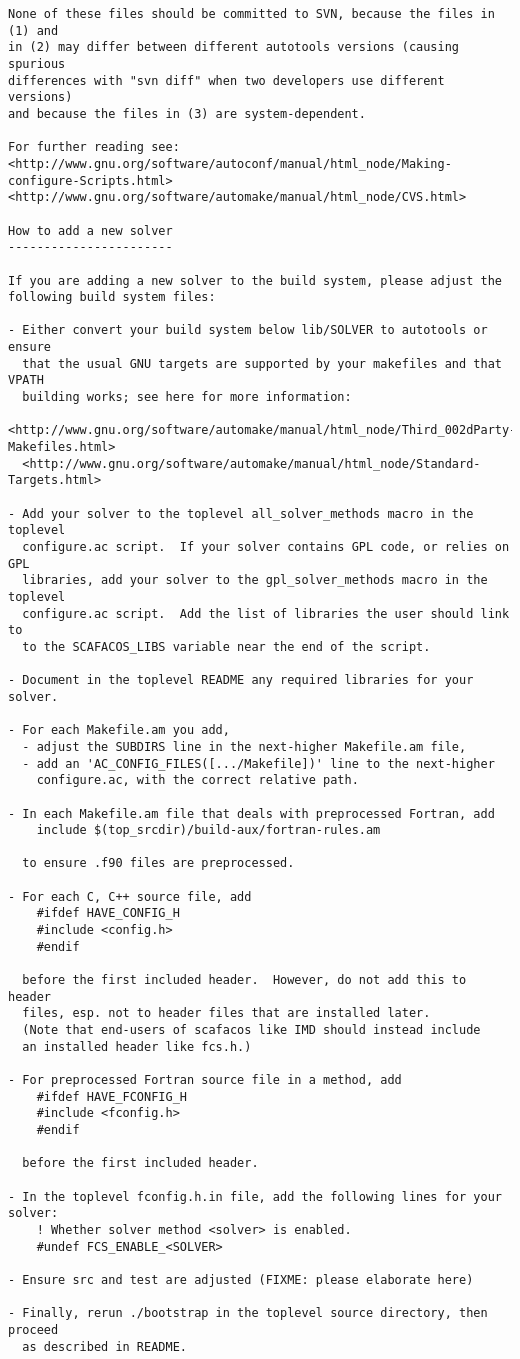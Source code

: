 \begin{verbatim}
None of these files should be committed to SVN, because the files in (1) and
in (2) may differ between different autotools versions (causing spurious
differences with "svn diff" when two developers use different versions)
and because the files in (3) are system-dependent.

For further reading see:
<http://www.gnu.org/software/autoconf/manual/html_node/Making-configure-Scripts.html>
<http://www.gnu.org/software/automake/manual/html_node/CVS.html>

How to add a new solver
-----------------------

If you are adding a new solver to the build system, please adjust the
following build system files:

- Either convert your build system below lib/SOLVER to autotools or ensure
  that the usual GNU targets are supported by your makefiles and that VPATH
  building works; see here for more information:
  <http://www.gnu.org/software/automake/manual/html_node/Third_002dParty-Makefiles.html>
  <http://www.gnu.org/software/automake/manual/html_node/Standard-Targets.html>

- Add your solver to the toplevel all_solver_methods macro in the toplevel
  configure.ac script.  If your solver contains GPL code, or relies on GPL
  libraries, add your solver to the gpl_solver_methods macro in the toplevel
  configure.ac script.  Add the list of libraries the user should link to
  to the SCAFACOS_LIBS variable near the end of the script.

- Document in the toplevel README any required libraries for your solver.

- For each Makefile.am you add,
  - adjust the SUBDIRS line in the next-higher Makefile.am file,
  - add an 'AC_CONFIG_FILES([.../Makefile])' line to the next-higher
    configure.ac, with the correct relative path.

- In each Makefile.am file that deals with preprocessed Fortran, add
    include $(top_srcdir)/build-aux/fortran-rules.am

  to ensure .f90 files are preprocessed.

- For each C, C++ source file, add
    #ifdef HAVE_CONFIG_H
    #include <config.h>
    #endif

  before the first included header.  However, do not add this to header
  files, esp. not to header files that are installed later.
  (Note that end-users of scafacos like IMD should instead include
  an installed header like fcs.h.)

- For preprocessed Fortran source file in a method, add
    #ifdef HAVE_FCONFIG_H
    #include <fconfig.h>
    #endif

  before the first included header.

- In the toplevel fconfig.h.in file, add the following lines for your solver:
    ! Whether solver method <solver> is enabled.
    #undef FCS_ENABLE_<SOLVER>

- Ensure src and test are adjusted (FIXME: please elaborate here)

- Finally, rerun ./bootstrap in the toplevel source directory, then proceed
  as described in README.
\end{verbatim}
